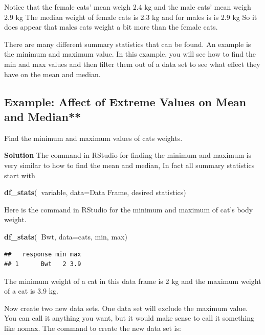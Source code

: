 \documentclass[
]{book}
\newenvironment{Shaded}{\begin{snugshade}}{\end{snugshade}}
\newcommand{\DataTypeTok}[1]{\textcolor[rgb]{0.13,0.29,0.53}{#1}}
\newcommand{\KeywordTok}[1]{\textcolor[rgb]{0.13,0.29,0.53}{\textbf{#1}}}
\newcommand{\NormalTok}[1]{#1}
\newcommand{\OperatorTok}[1]{\textcolor[rgb]{0.81,0.36,0.00}{\textbf{#1}}}
\begin{document}
Notice that the female cats' mean weigh 2.4 kg and the male cats' mean weigh 2.9 kg The median weight of female cats is 2.3 kg and for males is is 2.9 kg So it does appear that males cats weight a bit more than the female cats.

There are many different summary statistics that can be found. An example is the minimum and maximum value. In this example, you will see how to find the min and max values and then filter them out of a data set to see what effect they have on the mean and median.

\hypertarget{example-affect-of-extreme-values-on-mean-and-median}{%
\subsection{Example: Affect of Extreme Values on Mean and Median**}\label{example-affect-of-extreme-values-on-mean-and-median}}

Find the minimum and maximum values of cats weights.

\textbf{Solution}
The command in RStudio for finding the minimum and maximum is very similar to how to find the mean and median, In fact all summary statistics start with

\begin{Shaded}
\begin{Highlighting}[]
\KeywordTok{df_stats}\NormalTok{(}\OperatorTok{~}\NormalTok{variable, }\DataTypeTok{data=}\NormalTok{Data Frame, desired statistics)}
\end{Highlighting}
\end{Shaded}

Here is the command in RStudio for the minimum and maximum of cat's body weight.

\begin{Shaded}
\begin{Highlighting}[]
\KeywordTok{df_stats}\NormalTok{(}\OperatorTok{~}\NormalTok{Bwt, }\DataTypeTok{data=}\NormalTok{cats, min, max)}
\end{Highlighting}
\end{Shaded}

\begin{verbatim}
##   response min max
## 1      Bwt   2 3.9
\end{verbatim}

The minimum weight of a cat in this data frame is 2 kg and the maximum weight of a cat is 3.9 kg.

Now create two new data sets. One data set will exclude the maximum value. You can call it anything you want, but it would make sense to call it something like nomax. The command to create the new data set is:
\end{document}
